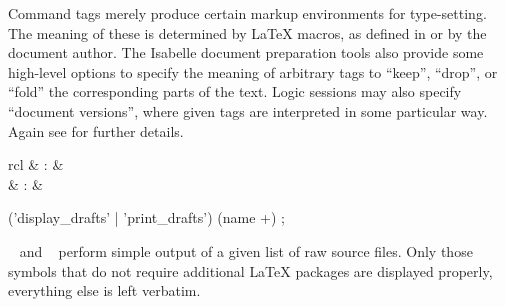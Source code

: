 \begin{isabellebody}
\begin{isamarkuptext}
  \medskip Command tags merely produce certain markup environments for
  type-setting.  The meaning of these is determined by {\LaTeX}
  macros, as defined in \hyperlink{file.~~/lib/texinputs/isabelle.sty}{\mbox{}} or
  by the document author.  The Isabelle document preparation tools
  also provide some high-level options to specify the meaning of
  arbitrary tags to ``keep'', ``drop'', or ``fold'' the corresponding
  parts of the text.  Logic sessions may also specify ``document
  versions'', where given tags are interpreted in some particular way.
  Again see \cite{isabelle-sys} for further details.%
\end{isamarkuptext}%
\isamarkuptrue%
%
\isamarkuptrue%
%
\begin{isamarkuptext}%
\begin{matharray}{rcl}
    \hypertarget{command.display-drafts}{\hyperlink{command.display-drafts}{\mbox{}}}\isa{{\isachardoublequote}\isactrlsup {\isacharasterisk}{\isachardoublequote}} & : &  \\
    \hypertarget{command.print-drafts}{\hyperlink{command.print-drafts}{\mbox{}}}\isa{{\isachardoublequote}\isactrlsup {\isacharasterisk}{\isachardoublequote}} & : &  \\
  \end{matharray}

  \begin{rail}
    ('display_drafts' | 'print_drafts') (name +)
    ;
  \end{rail}

  \begin{description}

  \item \hyperlink{command.display-drafts}{\mbox{}}~ and \hyperlink{command.print-drafts}{\mbox{}}~ perform simple output of a given list
  of raw source files.  Only those symbols that do not require
  additional {\LaTeX} packages are displayed properly, everything else
  is left verbatim.

  \end{description}%
\end{isamarkuptext}%
\isamarkuptrue%
%
\isadelimtheory
%
\endisadelimtheory
%
\isatagtheory
{}\isamarkupfalse%
%
\endisatagtheory
{\isafoldtheory}%
%
\isadelimtheory
%
\endisadelimtheory
\isanewline
\end{isabellebody}%
